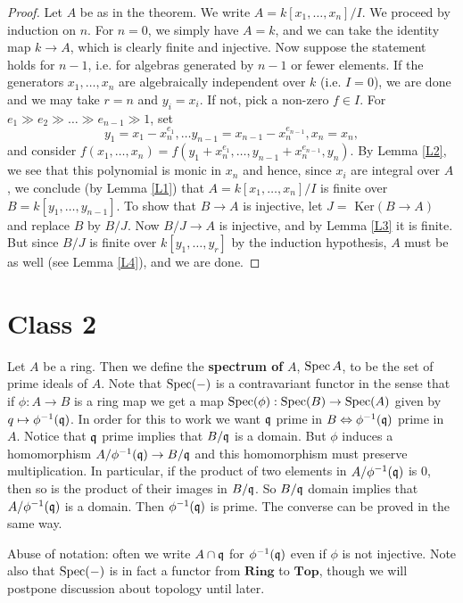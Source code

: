 \documentclass{../mathnotes}
\begin{document}
\begin{proof}
Let $A$ be as in the theorem. We write $A=k[x_1,\ldots, x_n]/I$. We proceed by induction on $n$. For $n=0$, we simply have $A=k$, and we can take the identity map $k\to A$, which is clearly finite and injective. Now suppose the statement holds for $n-1$, i.e. for algebras generated by $n-1$ or fewer elements. If the generators $x_1,\ldots,x_n$ are algebraically independent over $k$ (i.e. $I=0$), we are done and we may take $r=n$ and $y_i=x_i$. If not, pick a non-zero $f\in I$. For $e_1\gg e_2\gg\ldots\gg e_{n-1}\gg 1$, set
\[y_1=x_1-x_n^{e_1},\ldots y_{n-1}=x_{n-1}-x_n^{e_{n-1}},x_n=x_n,\]
and consider $f(x_1,\ldots, x_n)=f(y_1+x_n^{e_1},\ldots,y_{n-1}+x_n^{e_{n-1}},y_n)$. By  Lemma \ref{L2}, we see that this polynomial is monic in $x_n$ and hence, since $x_i$ are integral over $A$, we conclude (by Lemma \ref{L1}) that $A=k[x_1,\ldots,x_n]/I$ is finite over $B=k[y_1,\ldots, y_{n-1}]$. To show that $B\to A$ is injective, let $J =$ Ker$(B \to A)$ and replace $B$ by $B/J$. Now $B/J \to A$ is injective, and by Lemma \ref{L3} it is finite. But since $B/J$ is finite over $k[y_1,\ldots,y_r]$ by the induction hypothesis, $A$ must be as well (see Lemma \ref{L4}), and we are done.
\end{proof}


\section*{Class 2}

    Let $A$ be a ring. Then we define the \textbf{spectrum of} $A$, $\operatorname{Spec} A$, to be the set of prime ideals of $A$.
    Note that $\operatorname{Spec}(-)$ is a contravariant functor in the sense that if $\phi:A\to B$ is a ring map we get a map $\operatorname{Spec}(\phi):\operatorname{Spec}(B)\to\operatorname{Spec}(A)$ given by $q\mapsto \phi^{-1}(\mathfrak q)$. In order for this to work we want $\mathfrak q$ prime in $B \Leftrightarrow \phi^{-1}(\mathfrak q)$ prime in $A$. Notice that $\mathfrak q$ prime implies that $B/\mathfrak q$ is a domain. But $\phi$ induces a homomorphism $A/\phi^{-1}(\mathfrak q) \to B/\mathfrak q$ and this homomorphism must preserve multiplication. In particular, if the product of two elements in $A/\phi^{-1}(\mathfrak q)$ is 0, then so is the product of their images in $B/\mathfrak q$. So $B/\mathfrak q$ domain implies that $A/\phi^{-1}(\mathfrak q)$ is a domain. Then $\phi^{-1}(\mathfrak q)$ is prime. The converse can be proved in the same way.
    

\begin{rem}
    Abuse of notation: often we write $A\cap \mathfrak q$ for $\phi^{-1}(\mathfrak q)$ even if $\phi$ is not injective. Note also that $\operatorname{Spec}(-)$ is in fact a functor from $\mathbf{Ring}$ to $\mathbf{Top}$, though we will postpone discussion about topology until later.
\end{rem}
\end{document}
